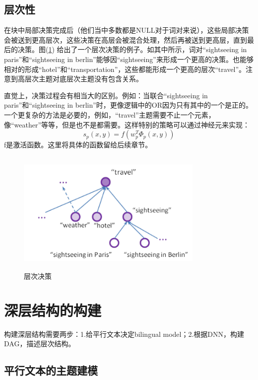 \documentclass[12pt,a4paper,titlepage]{article}
\begin{document}
\subsection{层次性}

在块中局部决策完成后（他们当中多数都是NULL对于词对来说），这些局部决策会被送到更高层次，这些决策在高层会被混合处理，然后再被送到更高层，直到最后的决策。图(\ref{fig:gao}) 给出了一个层次决策的例子。如其中所示，词对“sightseeing in paris”和“sightseeing in berlin”能够因“sightseeing”来形成一个更高的决策。也能够相对的形成“hotel”和“transportation”，这些都能形成一个更高的层次“travel”。注意到高层次主题对底层次主题没有包含关系。

直觉上，决策过程会有相当大的区别。例如：当联合“sightseeing in paris”和“sightseeing in berlin”时，更像逻辑中的OR因为只有其中的一个是正的。一个更复杂的方法是必要的，例如，“travel”主题需要不止一个元素，像“weather”等等，但是也不是都需要。这样特别的策略可以通过神经元来实现：
\begin{displaymath}
  s_p(x,y) = f(w_p^{T}\Phi_p(x,y))
\end{displaymath}
f是激活函数。这里将具体的函数留给后续章节。

\begin{figure}
  \centering
  \includegraphics[height=6cm,width=9cm]{gao.png}
  \caption{层次决策}
  \label{fig:gao}
\end{figure}

\section{深层结构的构建}

构建深层结构需要两步：1.给平行文本决定bilingual model；2.根据DNN，构建DAG，描述层次结构。

\subsection{平行文本的主题建模}
\end{document}
